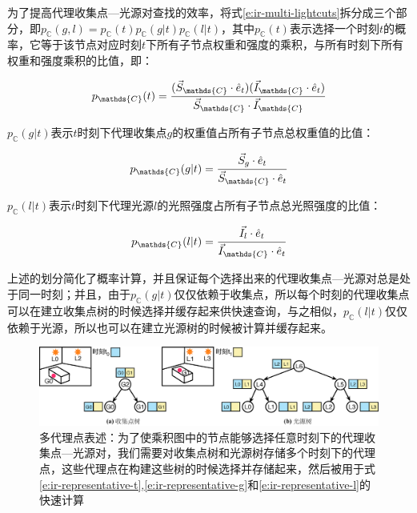 为了提高代理收集点—光源对查找的效率，\cite{a:MultidimensionalLightcuts}将式\ref{e:ir-multi-lightcuts}拆分成三个部分，即$p_{\mathds{C}}(g,l)=p_{\mathds{C}}(t)p_{\mathds{C}}(g|t)p_{\mathds{C}}(l|t)$，其中$p_{\mathds{C}}(t)$表示选择一个时刻$t$的概率，它等于该节点对应时刻$t$下所有子节点权重和强度的乘积，与所有时刻下所有权重和强度乘积的比值，即：

\begin{equation}\label{e:ir-representative-t}
	p_{\mathds{C}}(t)= \cfrac{(\vec{S}_{\mathds{C}}\cdot\hat{e}_t)( \vec{I}_{\mathds{C}}\cdot\hat{e}_t)}{\vec{S}_{\mathds{C}}\cdot\vec{I}_{\mathds{C}}}
\end{equation}

\noindent $p_{\mathds{C}}(g|t)$表示$t$时刻下代理收集点$g$的权重值占所有子节点总权重值的比值：

\begin{equation}\label{e:ir-representative-g}
	p_{\mathds{C}}(g|t)= \cfrac{\vec{S}_g\cdot\hat{e}_t}{\vec{S}_{\mathds{C}}\cdot\hat{e}_t}
\end{equation}

\noindent $p_{\mathds{C}}(l|t)$表示$t$时刻下代理光源$l$的光照强度占所有子节点总光照强度的比值：

\begin{equation}\label{e:ir-representative-l}
	p_{\mathds{C}}(l|t)= \cfrac{\vec{I}_l\cdot\hat{e}_t}{\vec{I}_{\mathds{C}}\cdot\hat{e}_t}
\end{equation}

\noindent 上述的划分简化了概率计算，并且保证每个选择出来的代理收集点—光源对总是处于同一时刻；并且，由于$p_{\mathds{C}}(g|t)$仅仅依赖于收集点，所以每个时刻的代理收集点可以在建立收集点树的时候选择并缓存起来供快速查询，与之相似，$p_{\mathds{C}}(l|t)$仅仅依赖于光源，所以也可以在建立光源树的时候被计算并缓存起来。

\begin{figure}
\begin{fullwidth}
	\includegraphics[width=1.0\thewidth]{figures/ir/multiple-representatives}
	\caption{多代理点表述：为了使乘积图中的节点能够选择任意时刻下的代理收集点—光源对，我们需要对收集点树和光源树存储多个时刻下的代理点，这些代理点在构建这些树的时候选择并存储起来，然后被用于式\ref{e:ir-representative-t},\ref{e:ir-representative-g}和\ref{e:ir-representative-l}的快速计算}
	\label{f:ir-multiple-representatives}
\end{fullwidth}
\end{figure}


